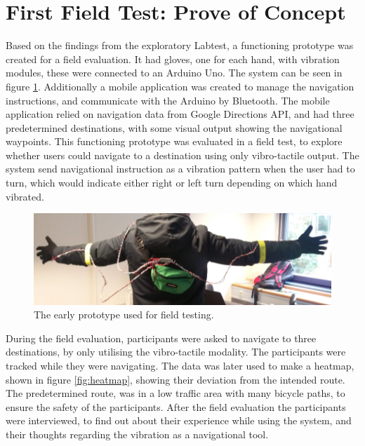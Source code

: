 \documentclass{sigchi}
\begin{document}
\section{First Field Test: Prove of Concept}
Based on the findings from the exploratory Labtest, a functioning prototype was created for a field evaluation. It had gloves, one for each hand, with vibration modules, these were connected to an Arduino Uno. The system can be seen in figure \ref{fig:enitial_prototype}. Additionally a mobile application was created to manage the navigation instructions, and communicate with the Arduino by Bluetooth. The mobile application relied on navigation data from Google Directions API, and had three predetermined destinations, with some visual output showing the navigational waypoints. 
\newline
\newline
This functioning prototype was evaluated in a field test, to explore whether users could navigate to a destination using only vibro-tactile output. The system send navigational instruction as a vibration pattern when the user had to turn, which would indicate either right or left turn depending on which hand vibrated. 
\begin{figure}[!b]
\centering
\includegraphics[width=1.01\columnwidth]{figures/enitial_prototype.png}
\caption{The early prototype used for field testing.}
\label{fig:enitial_prototype}
\end{figure} 
During the field evaluation, participants were asked to navigate to three destinations, by only utilising the vibro-tactile modality. The participants were tracked while they were navigating. The data was later used to make a heatmap, shown in figure \ref{fig:heatmap}, showing their deviation from the intended route. The predetermined route, was in a low traffic area with many bicycle paths, to ensure the safety of the participants. 
\newline
\newline 
After the field evaluation the participants were interviewed, to find out about their experience while using the system, and their thoughts regarding the vibration as a navigational tool. 
\end{document}
